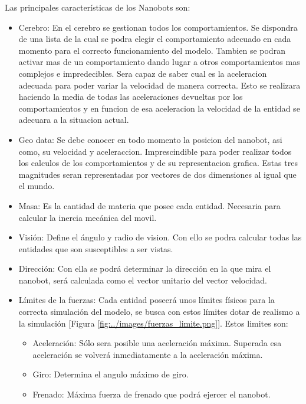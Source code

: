\noindent Las principales características de los Nanobots son:  
\begin{itemize}
 \item  Cerebro: En el cerebro se gestionan todos los comportamientos. Se dispondra de una lista de la cual se podra elegir el comportamiento adecuado en cada momento para el correcto funcionamiento del modelo. Tambien se podran activar mas de un comportamiento dando lugar a otros comportamientos mas complejos e impredecibles. Sera capaz de saber cual es la aceleracion adecuada para poder variar la velocidad de manera correcta. Esto se realizara haciendo la media de todas las aceleraciones devueltas por los comportamientos y en funcion de esa aceleracion la velocidad de la entidad se adecuara a la situacion actual.
 \item Geo data: Se debe conocer en todo momento la posicion del nanobot, asi como, su velocidad y aceleraccion. Imprescindible para poder realizar todos los calculos de los comportamientos y de su representacion grafica. Estas tres magnitudes seran representadas por vectores de dos dimensiones al igual que el mundo.
 \item Masa: Es la cantidad de materia que posee cada entidad. Necesaria para calcular la inercia mecánica del movil. 
 \item Visión: Define el ángulo y radio de vision. Con ello se podra calcular todas las entidades que son susceptibles a ser vistas.
 \item Dirección: Con ella se podrá determinar la dirección en la que mira el nanobot, será calculada como el vector unitario del vector velocidad.
 \item Límites de la fuerzas: Cada entidad poseerá unos límites físicos para la correcta simulación del modelo, se busca con estos límites dotar de realismo a la simulación [Figura \ref{fig:../images/fuerzas_limite.png}]. 
 Estos limites son:
 \begin{itemize}
   \item Aceleración: Sólo sera posible una aceleración máxima. Superada esa aceleración se volverá inmediatamente a la aceleración máxima.
   \item Giro: Determina el angulo máximo de giro.
   \item Frenado: Máxima fuerza de frenado que podrá ejercer el nanobot. 
 \end{itemize}	
\begin{figure}[h]
 \centering

\end{figure}
\end{itemize}
